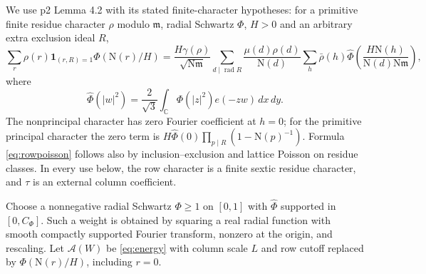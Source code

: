 \documentclass[11pt,a4paper]{article}
\numberwithin{equation}{section}
\theoremstyle{definition}
\theoremstyle{remark}
\newcommand{\C}{\mathbb C}
\newcommand{\N}{\mathrm N}
\newcommand{\ind}{\mathbf 1}
\newcommand{\dd}{\,d}
\newcommand{\rad}{\operatorname{rad}}
\newcommand{\wt}{\widehat}
\begin{document}
We use p2 Lemma 4.2 with its stated finite-character hypotheses: for a primitive finite residue character $\rho$ modulo $\mathfrak m$, radial Schwartz $\Phi$, $H>0$ and an arbitrary extra exclusion ideal $R$,
\begin{equation}\label{eq:rowpoisson}
 \sum_r\rho(r)\ind_{(r,R)=1}\Phi(\N(r)/H)
 =\frac{H\gamma(\rho)}{\sqrt{\N\mathfrak m}}
 \sum_{d\mid\rad R}\frac{\mu(d)\rho(d)}{\N(d)}
 \sum_h\bar\rho(h)\wt\Phi\left(\frac{H\N(h)}{\N(d)\N\mathfrak m}\right),
\end{equation}
where
\[
 \wt\Phi(|w|^2)=\frac2{\sqrt3}\int_\C\Phi(|z|^2)e(-zw)\dd x\dd y.
\]
The nonprincipal character has zero Fourier coefficient at $h=0$; for the primitive principal character the zero term is $H\wt\Phi(0)\prod_{p\mid R}(1-\N(p)^{-1})$. Formula \eqref{eq:rowpoisson} follows also by inclusion--exclusion and lattice Poisson on residue classes. In every use below, the row character is a finite sextic residue character, and $\tau$ is an external column coefficient.

Choose a nonnegative radial Schwartz $\Phi\ge1$ on $[0,1]$ with $\wt\Phi$ supported in $[0,C_\Phi]$. Such a weight is obtained by squaring a real radial function with smooth compactly supported Fourier transform, nonzero at the origin, and rescaling. Let $\mathcal A(W)$ be \eqref{eq:energy} with column scale $L$ and row cutoff replaced by $\Phi(\N(r)/H)$, including $r=0$.
\end{document}

